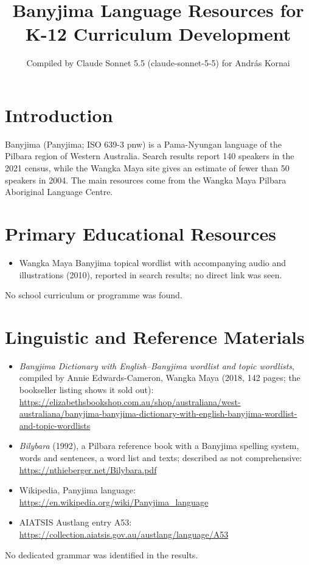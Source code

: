 \documentclass[12pt]{article}
\title{Banyjima Language Resources for K-12 Curriculum Development}
\author{Compiled by Claude Sonnet 5.5 (claude-sonnet-5-5) for Andr\'as Kornai}
\date{}
\begin{document}
\maketitle

\section{Introduction}
Banyjima (Panyjima; ISO 639-3 pnw) is a Pama-Nyungan language of the Pilbara region of Western Australia. Search results report 140 speakers in the 2021 census, while the Wangka Maya site gives an estimate of fewer than 50 speakers in 2004. The main resources come from the Wangka Maya Pilbara Aboriginal Language Centre.

\section{Primary Educational Resources}
\begin{itemize}
\item Wangka Maya Banyjima topical wordlist with accompanying audio and illustrations (2010), reported in search results; no direct link was seen.
\end{itemize}
No school curriculum or programme was found.

\section{Linguistic and Reference Materials}
\begin{itemize}
\item \emph{Banyjima Dictionary with English--Banyjima wordlist and topic wordlists}, compiled by Annie Edwards-Cameron, Wangka Maya (2018, 142 pages; the bookseller listing shows it sold out): \url{https://elizabethsbookshop.com.au/shop/australiana/west-australiana/banyjima-banyjima-dictionary-with-english-banyjima-wordlist-and-topic-wordlists}
\item \emph{Bilybara} (1992), a Pilbara reference book with a Banyjima spelling system, words and sentences, a word list and texts; described as not comprehensive: \url{https://nthieberger.net/Bilybara.pdf}
\item Wikipedia, Panyjima language: \url{https://en.wikipedia.org/wiki/Panyjima_language}
\item AIATSIS Austlang entry A53: \url{https://collection.aiatsis.gov.au/austlang/language/A53}
\end{itemize}
No dedicated grammar was identified in the results.
\end{document}
